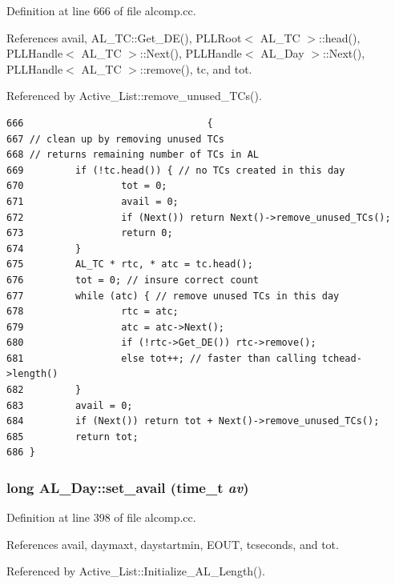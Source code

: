 Definition at line 666 of file alcomp.cc.

References avail, AL\_\-TC::Get\_\-DE(), PLLRoot$<$ AL\_\-TC $>$::head(), PLLHandle$<$ AL\_\-TC $>$::Next(), PLLHandle$<$ AL\_\-Day $>$::Next(), PLLHandle$<$ AL\_\-TC $>$::remove(), tc, and tot.

Referenced by Active\_\-List::remove\_\-unused\_\-TCs().



\footnotesize\begin{verbatim}666                                {
667 // clean up by removing unused TCs
668 // returns remaining number of TCs in AL
669         if (!tc.head()) { // no TCs created in this day
670                 tot = 0;
671                 avail = 0;
672                 if (Next()) return Next()->remove_unused_TCs();
673                 return 0;
674         }
675         AL_TC * rtc, * atc = tc.head();
676         tot = 0; // insure correct count
677         while (atc) { // remove unused TCs in this day
678                 rtc = atc;
679                 atc = atc->Next();
680                 if (!rtc->Get_DE()) rtc->remove();
681                 else tot++; // faster than calling tchead->length()
682         }
683         avail = 0;
684         if (Next()) return tot + Next()->remove_unused_TCs();
685         return tot;
686 }
\end{verbatim}\normalsize 
{}
\subsubsection{\setlength{\rightskip}{0pt plus 5cm}long AL\_\-Day::set\_\-avail (time\_\-t {\em av})}\label{classAL__Day_a14}




Definition at line 398 of file alcomp.cc.

References avail, daymaxt, daystartmin, EOUT, tcseconds, and tot.

Referenced by Active\_\-List::Initialize\_\-AL\_\-Length().



